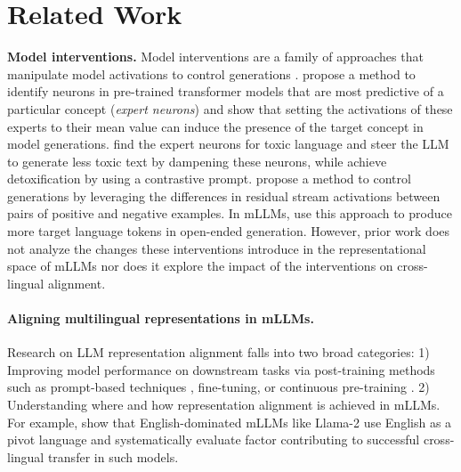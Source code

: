 \section{Related Work}
\textbf{Model interventions.} Model interventions are a family of approaches that manipulate model activations to control generations \cite{li_activation_steering, turner2024_steering, rodriguez2024controlling}. \citet{pmlr-v162-cuadros22a} propose a method to identify neurons in pre-trained transformer models that are most predictive of a particular concept (\textit{expert neurons}) and show that setting the activations of these experts to their mean value can induce the presence of the target concept in model generations. \citet{suau2024whispering} find the expert neurons for toxic language and steer the LLM to generate less toxic text by dampening these neurons, while \citet{turner2024_steering} achieve detoxification by using a contrastive prompt. \citet{rimsky_steering} propose a method to control generations by leveraging the differences in residual stream activations between pairs of positive and negative examples. In mLLMs,  \citet{Kojima_et_al} use this approach to produce more target language tokens in open-ended generation. However, prior work does not analyze the changes these interventions introduce in the representational space of mLLMs nor does it explore the impact of the interventions on cross-lingual alignment.


\paragraph{Aligning multilingual representations in mLLMs.} 
Research on LLM representation alignment falls into two broad categories:  1) Improving model performance on downstream tasks via post-training methods such as prompt-based techniques \cite{huang-etal-mprompt, tanwar-prompt_multi}, fine-tuning, or continuous pre-training \cite{zhang2023_crosslingualalignment, li2024_align}. 2)  Understanding where and how representation alignment is achieved in mLLMs. For example, \citet{wendler2024llamasworkenglishlatent} show that English-dominated mLLMs like Llama-2 use English as a pivot language and \citealt{zhao_llama} systematically evaluate factor contributing to successful cross-lingual transfer in such models.